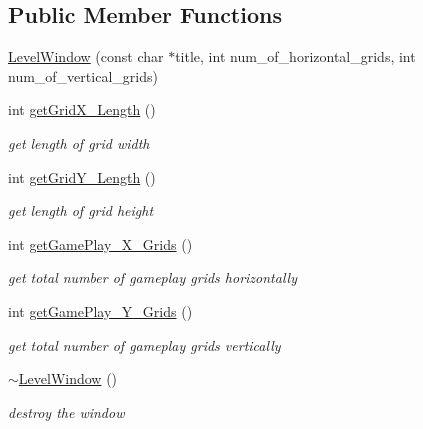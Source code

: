 \subsection*{Public Member Functions}
\begin{DoxyCompactItemize}
\item 
\hyperlink{class_level_window_a2a9cf49d7e82deb24c7f80eb6cae11a8}{Level\+Window} (const char $\ast$title, int num\+\_\+of\+\_\+horizontal\+\_\+grids, int num\+\_\+of\+\_\+vertical\+\_\+grids)
\item 
\hypertarget{class_level_window_a9f94ee3990c5257f066a836d526922f5}{}\label{class_level_window_a9f94ee3990c5257f066a836d526922f5} 
int \hyperlink{class_level_window_a9f94ee3990c5257f066a836d526922f5}{get\+Grid\+X\+\_\+\+Length} ()
\begin{DoxyCompactList}\small\item\em get length of grid width \end{DoxyCompactList}\item 
\hypertarget{class_level_window_a317a7fef1614537a2034bc7248a8c30a}{}\label{class_level_window_a317a7fef1614537a2034bc7248a8c30a} 
int \hyperlink{class_level_window_a317a7fef1614537a2034bc7248a8c30a}{get\+Grid\+Y\+\_\+\+Length} ()
\begin{DoxyCompactList}\small\item\em get length of grid height \end{DoxyCompactList}\item 
\hypertarget{class_level_window_a8a812a95b2c9e378cc451070031bf9e4}{}\label{class_level_window_a8a812a95b2c9e378cc451070031bf9e4} 
int \hyperlink{class_level_window_a8a812a95b2c9e378cc451070031bf9e4}{get\+Game\+Play\+\_\+\+X\+\_\+\+Grids} ()
\begin{DoxyCompactList}\small\item\em get total number of gameplay grids horizontally \end{DoxyCompactList}\item 
\hypertarget{class_level_window_abbed0134acbee59410bc02d50ad3d819}{}\label{class_level_window_abbed0134acbee59410bc02d50ad3d819} 
int \hyperlink{class_level_window_abbed0134acbee59410bc02d50ad3d819}{get\+Game\+Play\+\_\+\+Y\+\_\+\+Grids} ()
\begin{DoxyCompactList}\small\item\em get total number of gameplay grids vertically \end{DoxyCompactList}\item 
\hypertarget{class_level_window_a6794f1caeae1b6d7dce7196613fb1f39}{}\label{class_level_window_a6794f1caeae1b6d7dce7196613fb1f39} 
\hyperlink{class_level_window_a6794f1caeae1b6d7dce7196613fb1f39}{$\sim$\+Level\+Window} ()
\begin{DoxyCompactList}\small\item\em destroy the window \end{DoxyCompactList}\end{DoxyCompactItemize}
